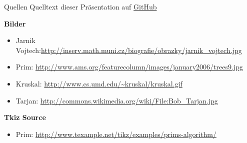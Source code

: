\begin{frame}{Quellen}
	Quelltext dieser Präsentation auf \href{https://github.com/MartinThoma/ICPC-Referat}{GitHub}

	\textbf{Bilder}
	\begin{itemize}
		\item Jarnik Vojtech:\url{http://inserv.math.muni.cz/biografie/obrazky/jarnik_vojtech.jpg}
		\item Prim: \url{http://www.ams.org/featurecolumn/images/january2006/trees9.jpg}
		\item Kruskal: \url{http://www.cs.umd.edu/~kruskal/kruskal.gif}
		\item Tarjan: \url{http://commons.wikimedia.org/wiki/File:Bob_Tarjan.jpg}
	\end{itemize}

 	\textbf{Tkiz Source}
 	\begin{itemize}
 		\item Prim: \url{http://www.texample.net/tikz/examples/prims-algorithm/}
 	\end{itemize}
\end{frame}
